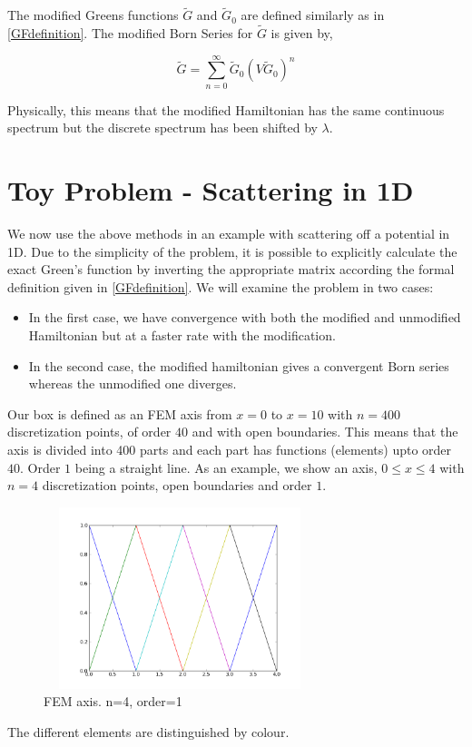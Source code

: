 \documentclass[a4paper,10pt]{report}
\begin{document}
The modified Greens functions $\widetilde{G}$ and $\widetilde{G}_0$ are defined similarly as
in \eqref{GFdefinition}. The modified Born Series for $\widetilde{G}$ is given by,

\begin{equation}\label{BornSeriesModCompact}
 \widetilde{G}=\displaystyle\sum_{n=0}^{\infty}\widetilde{G}_0\left(V\widetilde{G}_0\right)^n
\end{equation}

\noindent Physically, this means that the modified Hamiltonian has the same continuous spectrum but the discrete
spectrum has been shifted by $\lambda$.

\section{Toy Problem - Scattering in 1D}
We now use the above methods in an example with scattering off a potential in 1D. Due to the simplicity of the problem,
it is possible to explicitly calculate the exact Green's function by inverting the appropriate matrix according the formal
definition given in \eqref{GFdefinition}. We will examine the problem in two cases: 
\begin{itemize}
 \item In the first case, we have convergence with both the modified and unmodified Hamiltonian but at a faster rate with the modification.
 \item In the second case, the modified hamiltonian gives a convergent Born series whereas the unmodified one diverges. 
\end{itemize}

Our box is defined as an FEM axis from $x=0$ to $x=10$ with $n=400$ discretization points, 
of order $40$ and with open boundaries. This means that the axis is divided into 400 
parts and each part has functions (elements) upto order $40$. Order $1$ being a straight
line. As an example, we show an axis, $0\leq x\leq 4$ with $n=4$ discretization points, open
boundaries and order $1$.

\begin{figure}[hm]
\centering
\includegraphics[width=225pt, height=150pt]{femexample1.png}
\caption[\textwidth]{FEM axis. n=4, order=1}
\end{figure}
The different elements are distinguished by colour.
\end{document}
